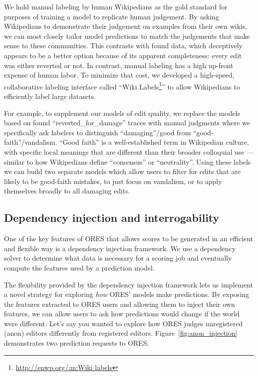 %
We hold manual labeling by human Wikipedians as the gold standard for purposes of training a model to replicate human judgement.  By asking Wikipedians to demonstrate their judgement on examples from their own wikis, we can most closely tailor model predictions to match the judgements that make sense to these communities.  This contrasts with found data, which deceptively appears to be a better option because of its apparent completeness: every edit was either reverted or not.  In contrast, manual labeling has a high up-front expense of human labor.  To minimize that cost, we developed a high-speed, collaborative labeling interface called ``Wiki Labels\footnote{\url{http://enwp.org/:m:Wiki labels}}'' to allow Wikipedians to efficiently label large datasets.

For example, to supplement our models of edit quality, we replace the models based on found ``reverted\_for\_damage'' traces with manual judgments where we specifically ask labelers to distinguish ``damaging''/good from ``good-faith''/vandalism. ``Good faith'' is a well-established term in Wikipedian culture, with specific local meanings that are different than their broader colloquial use --- similar to how Wikipedians define ``consensus'' or ``neutrality''.  Using these labels we can build two separate models which allow users to filter for edits that are likely to be good-faith mistakes\cite{halfaker2017automated}, to just focus on vandalism, or to apply themselves broadly to all damaging edits.

\subsection{Dependency injection and interrogability}
One of the key features of ORES that allows scores to be generated in an efficient and flexible way is a dependency injection framework.  We use a dependency solver to determine what data is necessary for a scoring job and eventually compute the features used by a prediction model.

The flexibility provided by the dependency injection framework lets us implement a novel strategy for exploring \emph{how} ORES' models make predictions.  By exposing the features extracted to ORES users and allowing them to inject their own features, we can allow users to ask how predictions would change if the world were different.  Let's say you wanted to explore how ORES judges unregistered (anon) editors differently from registered editors.  Figure~\ref{fig:anon_injection} demonstrates two prediction requests to ORES.

